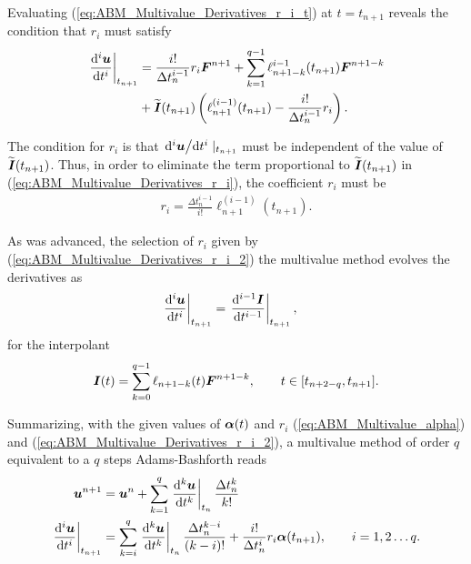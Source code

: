 Evaluating (\ref{eq:ABM_Multivalue_Derivatives_r_i_t}) at $t=t_{n+1}$ reveals the condition that $r_i$ must satisfy
%
\begin{align}
	\eval{\dv[i]{ \vect{u} }{t}}_{t_{n+1}}
	&
	=
	\frac{i!}{\Delta t_n^{i-1}} 
	r_i
	\vect{F}^{n+1}
	+
	\sum_{k=1}^{q-1}
	\ell_{n+1-k}^{i-1}(t_{n+1})
	\vect{F}^{n+1-k}
	\nonumber
	\\
	&
	+
	\widetilde{\vect{I}}(t_{n+1})
	\left(
	\ell_{n+1}^{(i-1)}(t_{n+1})
	-
	\frac{i!}{\Delta t_n^{i-1}} 
	r_i
	\right)
	.
	\label{eq:ABM_Multivalue_Derivatives_r_i}
\end{align}

The condition for $r_i$ is that $\dv*[i]{ \boldsymbol{u} }{t}|_{t_{n+1}}$ must be independent of the value of $\widetilde{\boldsymbol{I}}(t_{n+1})$. Thus, in order to eliminate the term proportional to $\widetilde{\boldsymbol{I}}(t_{n+1})$ in (\ref{eq:ABM_Multivalue_Derivatives_r_i}), the coefficient $r_i$ must be
%
\begin{align}
	r_i
	=
	\frac{\Delta t_n^{i-1}}{i!}
	\ell_{n+1}^{(i-1)}(t_{n+1}). 
	\label{eq:ABM_Multivalue_Derivatives_r_i_2}
\end{align}

As was advanced, the selection of $r_i$ given by (\ref{eq:ABM_Multivalue_Derivatives_r_i_2}) the multivalue method evolves the derivatives as   
%
\begin{align}
	\eval{\dv[i]{ \vect{u} }{t}}_{t_{n+1}}
	&
	=\eval{\dv[i-1]{ \vect{I} }{t}}_{t_{n+1}},
\end{align} 
for the interpolant
%
\begin{align}
	\boldsymbol{I}(t)=
	\sum_{k=0}^{q-1}
	\ell_{n+1-k}(t)
	\boldsymbol{F}^{n+1-k},
	\qquad
	t\in[t_{n+2-q},t_{n+1}].
	\label{eq:Multivalue_AM_Interpolant}
\end{align}

Summarizing, with the given values of $\boldsymbol{\alpha}(t)$ and $r_i$ (\ref{eq:ABM_Multivalue_alpha}) and (\ref{eq:ABM_Multivalue_Derivatives_r_i_2}), a multivalue method of order $q$ equivalent to a $q$ steps Adams-Bashforth reads
%
\begin{align}
	\vect{u}^{n+1}
	& =
	\vect{u}^{n}
	+
	\sum_{k = 1}^{q}
	\eval{ \dv[k]{\vect{u}}{t} }_{t_n}
	\frac{\Delta t_n^k}{k!}
	\label{eq:AB_Multivalue_u}
	\\ 
	\eval{\dv[i]{ \vect{u} }{t}}_{t_{n+1}}
	& =
	\sum_{k = i}^{q}
	\eval{ \dv[k]{\vect{u}}{t} }_{t_n}
	\frac{\Delta t_n^{k-i}}{(k-i)!}
	+
	\frac{i!}{\Delta t_{n}^{i}} 
	r_i
	\vect{\alpha}(t_{n+1})
	,
	\qquad i = 1,2 \ldots q.
	\label{eq:AB_Multivalue_derivatives}
\end{align}


